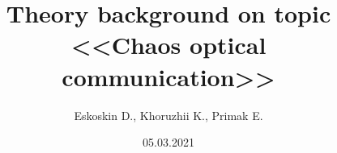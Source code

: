 \documentclass[]{beamer}
\title[Optical chaos]{Theory background on topic \\ <<Chaos optical communication>>}
\author{Eskoskin D., Khoruzhii K., Primak E.}
\institute[MIPT]
\begin{document}
\date{05.03.2021}
\maketitle

% 

% 
% 
% 






\end{document}
